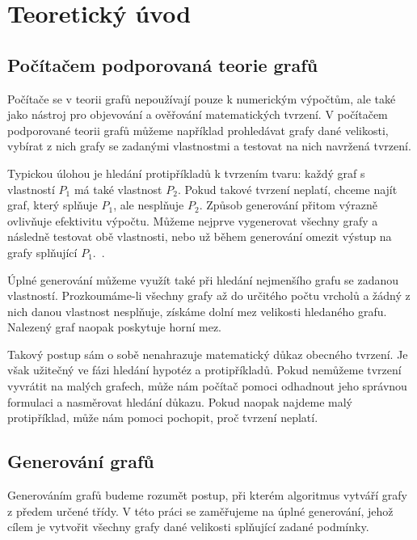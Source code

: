 \chapter{Teoretický úvod}
\label{chap:theory}

\section{Počítačem podporovaná teorie grafů}
\label{sec:computer-assisted-graph-theory}

Počítače se v teorii grafů nepoužívají pouze k numerickým výpočtům, ale také jako
nástroj pro objevování a ověřování matematických tvrzení. V počítačem podporované
teorii grafů můžeme například prohledávat grafy dané velikosti, vybírat z nich
grafy se zadanými vlastnostmi a testovat na nich navržená tvrzení.

Typickou úlohou je hledání protipříkladů k tvrzením tvaru: každý graf s vlastností
\(P_1\) má také vlastnost \(P_2\). Pokud takové tvrzení neplatí, chceme najít graf,
který splňuje \(P_1\), ale nesplňuje \(P_2\). Způsob generování přitom
výrazně ovlivňuje efektivitu výpočtu. Můžeme nejprve vygenerovat všechny grafy
a následně testovat obě vlastnosti, nebo už během generování omezit výstup na
grafy splňující \(P_1\).~\cite[Section~2]{jooken2025computerassisted}.

Úplné generování můžeme využít také při hledání nejmenšího grafu se zadanou
vlastností. Prozkoumáme-li všechny grafy až do určitého počtu vrcholů a žádný
z nich danou vlastnost nesplňuje, získáme dolní mez velikosti hledaného grafu.
Nalezený graf naopak poskytuje horní mez.

Takový postup sám o sobě nenahrazuje matematický důkaz obecného tvrzení. Je však
užitečný ve fázi hledání hypotéz a protipříkladů. Pokud nemůžeme tvrzení vyvrátit na
malých grafech, může nám počítač pomoci odhadnout jeho správnou formulaci a nasměrovat
hledání důkazu. Pokud naopak najdeme malý protipříklad, může nám pomoci pochopit, proč
tvrzení neplatí.


\section{Generování grafů}
\label{sec:graph-generation}

Generováním grafů budeme rozumět postup, při kterém algoritmus vytváří grafy
z předem určené třídy.
V této práci se zaměřujeme na úplné generování, jehož cílem je vytvořit
všechny grafy dané velikosti splňující zadané podmínky.

